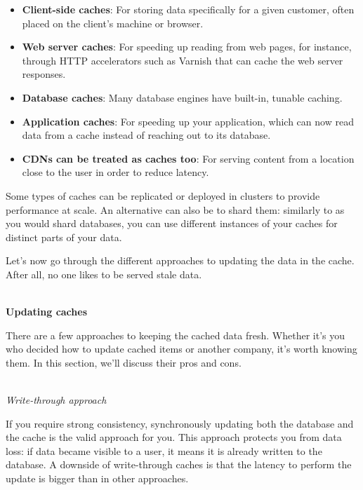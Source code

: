 \begin{itemize}
\item 
\textbf{Client-side caches}: For storing data specifically for a given customer, often placed on the client's machine or browser.


\item 
\textbf{Web server caches}: For speeding up reading from web pages, for instance, through HTTP accelerators such as Varnish that can cache the web server responses.

\item
\textbf{Database caches}: Many database engines have built-in, tunable caching.

\item
\textbf{Application caches}: For speeding up your application, which can now read data from a cache instead of reaching out to its database.


\item
\textbf{CDNs can be treated as caches too}: For serving content from a location close to the user in order to reduce latency.

\end{itemize}

Some types of caches can be replicated or deployed in clusters to provide performance at scale. An alternative can also be to shard them: similarly to as you would shard databases, you can use different instances of your caches for distinct parts of your data.

Let's now go through the different approaches to updating the data in the cache. After all, no one likes to be served stale data.


\hspace*{\fill} \\ %
\noindent
\textbf{Updating caches}

There are a few approaches to keeping the cached data fresh. Whether it's you who decided how to update cached items or another company, it's worth knowing them. In this section, we'll discuss their pros and cons.


\hspace*{\fill} \\ %
\noindent
\textit{Write-through approach}

If you require strong consistency, synchronously updating both the database and the cache is the valid approach for you. This approach protects you from data loss: if data became visible to a user, it means it is already written to the database. A downside of write-through caches is that the latency to perform the update is bigger than in other approaches.

